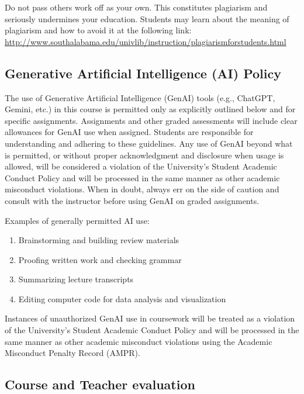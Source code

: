 \documentclass[11pt,]{article}
\begin{document}
Do not pass others work off as your own. This constitutes plagiarism and
seriously undermines your education. Students may learn about the
meaning of plagiarism and how to avoid it at the following link:
\url{http://www.southalabama.edu/univlib/instruction/plagiarismforstudents.html}

\subsection{Generative Artificial Intelligence (AI)
Policy}\label{generative-artificial-intelligence-ai-policy}

The use of Generative Artificial Intelligence (GenAI) tools (e.g.,
ChatGPT, Gemini, etc.) in this course is permitted only as explicitly
outlined below and for specific assignments. Assignments and other
graded assessments will include clear allowances for GenAI use when
assigned. Students are responsible for understanding and adhering to
these guidelines. Any use of GenAI beyond what is permitted, or without
proper acknowledgment and disclosure when usage is allowed, will be
considered a violation of the University's Student Academic Conduct
Policy and will be processed in the same manner as other academic
misconduct violations. When in doubt, always err on the side of caution
and consult with the instructor before using GenAI on graded
assignments.

Examples of generally permitted AI use:

\begin{enumerate}
\def\labelenumi{\arabic{enumi}.}
\item
  Brainstorming and building review materials
\item
  Proofing written work and checking grammar
\item
  Summarizing lecture transcripts
\item
  Editing computer code for data analysis and visualization
\end{enumerate}

Instances of unauthorized GenAI use in coursework will be treated as a
violation of the University's Student Academic Conduct Policy and will
be processed in the same manner as other academic misconduct violations
using the Academic Misconduct Penalty Record (AMPR).

\subsection{Course and Teacher
evaluation}\label{course-and-teacher-evaluation}
\end{document}
